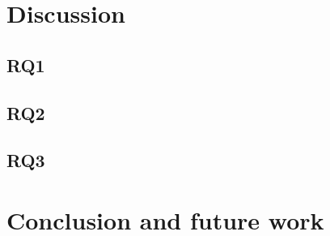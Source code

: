 \documentclass[conference]{IEEEtran}
\begin{document}
\section{Discussion}
\label{sec:disc}

\subsection{RQ1}
\subsection{RQ2}
\subsection{RQ3}

\section{Conclusion and future work}
\label{sec:conc}



\end{document}

